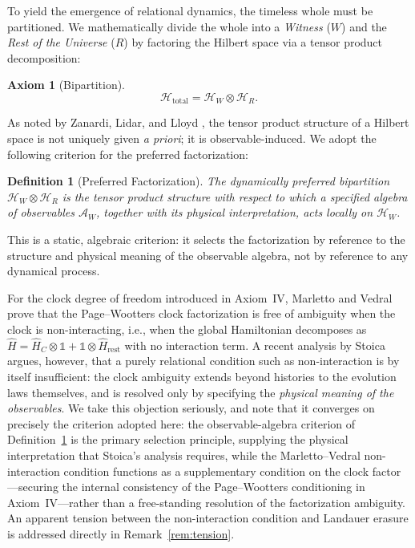 \documentclass[11pt, a4paper]{article}
\newtheorem{axiom}{Axiom}
\newtheorem{definition}{Definition}
\begin{document}
To yield the emergence of relational dynamics, the timeless whole must be partitioned. We mathematically divide the whole into a \emph{Witness} ($W$) and the \emph{Rest of the Universe} ($R$) by factoring the Hilbert space via a tensor product decomposition:

\begin{axiom}[Bipartition]
\begin{equation}
\mathcal{H}_{\mathrm{total}} = \mathcal{H}_W \otimes \mathcal{H}_R.
\label{eq:bipartition}
\end{equation}
\end{axiom}

As noted by Zanardi, Lidar, and Lloyd \cite{Zanardi2004}, the tensor product structure of a Hilbert space is not uniquely given \emph{a priori}; it is observable-induced. We adopt the following criterion for the preferred factorization:

\begin{definition}[Preferred Factorization]
\label{def:factorization}
The dynamically preferred bipartition $\mathcal{H}_W \otimes \mathcal{H}_R$ is the tensor product structure with respect to which a specified algebra of observables $\mathcal{A}_W$, together with its physical interpretation, acts locally on $\mathcal{H}_W$.
\end{definition}

This is a static, algebraic criterion: it selects the factorization by reference to the structure and physical meaning of the observable algebra, not by reference to any dynamical process.

For the clock degree of freedom introduced in Axiom~IV, Marletto and Vedral \cite{Marletto2017} prove that the Page--Wootters clock factorization is free of ambiguity when the clock is non-interacting, i.e., when the global Hamiltonian decomposes as $\hat{H} = \hat{H}_C \otimes \mathbb{1} + \mathbb{1} \otimes \hat{H}_{\mathrm{rest}}$ with no interaction term. A recent analysis by Stoica \cite{Stoica2026} argues, however, that a purely relational condition such as non-interaction is by itself insufficient: the clock ambiguity extends beyond histories to the evolution laws themselves, and is resolved only by specifying the \emph{physical meaning of the observables}. We take this objection seriously, and note that it converges on precisely the criterion adopted here: the observable-algebra criterion of Definition~\ref{def:factorization} is the primary selection principle, supplying the physical interpretation that Stoica's analysis requires, while the Marletto--Vedral non-interaction condition functions as a supplementary condition on the clock factor---securing the internal consistency of the Page--Wootters conditioning in Axiom~IV---rather than a free-standing resolution of the factorization ambiguity. An apparent tension between the non-interaction condition and Landauer erasure is addressed directly in Remark~\ref{rem:tension}.
\end{document}
